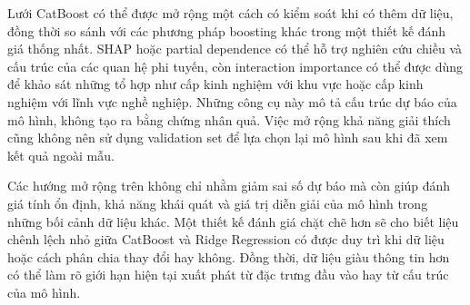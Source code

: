 Lưới CatBoost có thể được mở rộng một cách có kiểm soát khi có thêm dữ
liệu, đồng thời so sánh với các phương pháp boosting khác trong một
thiết kế đánh giá thống nhất. SHAP hoặc partial dependence có thể hỗ trợ
nghiên cứu chiều và cấu trúc của các quan hệ phi tuyến, còn interaction
importance có thể được dùng để khảo sát những tổ hợp như cấp kinh nghiệm
với khu vực hoặc cấp kinh nghiệm với lĩnh vực nghề nghiệp. Những công cụ
này mô tả cấu trúc dự báo của mô hình, không tạo ra bằng chứng nhân quả.
Việc mở rộng khả năng giải thích cũng không nên sử dụng validation set
để lựa chọn lại mô hình sau khi đã xem kết quả ngoài mẫu.

Các hướng mở rộng trên không chỉ nhằm giảm sai số dự báo mà còn giúp
đánh giá tính ổn định, khả năng khái quát và giá trị diễn giải của mô
hình trong những bối cảnh dữ liệu khác. Một thiết kế đánh giá chặt chẽ
hơn sẽ cho biết liệu chênh lệch nhỏ giữa CatBoost và Ridge Regression có
được duy trì khi dữ liệu hoặc cách phân chia thay đổi hay không. Đồng
thời, dữ liệu giàu thông tin hơn có thể làm rõ giới hạn hiện tại xuất
phát từ đặc trưng đầu vào hay từ cấu trúc của mô hình.
